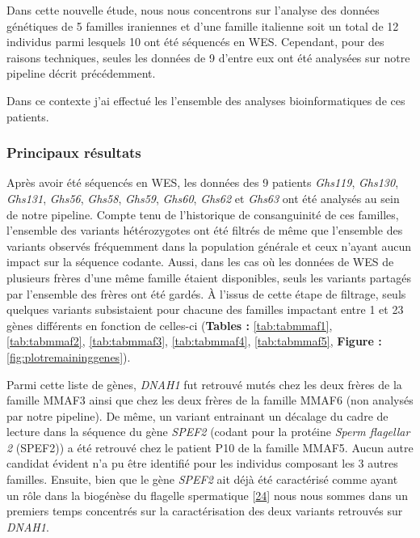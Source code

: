 \documentclass[12pt,twoside]{ugathesis}
\begin{document}
Dans cette nouvelle étude, nous nous concentrons sur l'analyse des
données génétiques de 5 familles iraniennes et d'une famille italienne
soit un total de 12 individus parmi lesquels 10 ont été séquencés en
WES. Cependant, pour des raisons techniques, seules les données de 9
d'entre eux ont été analysées sur notre pipeline décrit précédemment.

Dans ce contexte j'ai effectué les l'ensemble des analyses
bioinformatiques de ces patients.

\newpage



\newpage

\subsubsection{Principaux résultats}\label{principaux-resultats-2}

Après avoir été séquencés en WES, les données des 9 patients
\emph{Ghs119}, \emph{Ghs130}, \emph{Ghs131}, \emph{Ghs56}, \emph{Ghs58},
\emph{Ghs59}, \emph{Ghs60}, \emph{Ghs62} et \emph{Ghs63} ont été
analysés au sein de notre pipeline. Compte tenu de l'historique de
consanguinité de ces familles, l'ensemble des variants hétérozygotes ont
été filtrés de même que l'ensemble des variants observés fréquemment
dans la population générale et ceux n'ayant aucun impact sur la séquence
codante. Aussi, dans les cas où les données de WES de plusieurs frères
d'une même famille étaient disponibles, seuls les variants partagés par
l'ensemble des frères ont été gardés. À l'issus de cette étape de
filtrage, seuls quelques variants subsistaient pour chacune des familles
impactant entre 1 et 23 gènes différents en fonction de celles-ci
(\textbf{Tables :} \ref{tab:tabmmaf1}, \ref{tab:tabmmaf2},
\ref{tab:tabmmaf3}, \ref{tab:tabmmaf4}, \ref{tab:tabmmaf5},
\textbf{Figure : }\ref{fig:plotremaininggenes}).

Parmi cette liste de gènes, \emph{DNAH1} fut retrouvé mutés chez les
deux frères de la famille MMAF3 ainsi que chez les deux frères de la
famille MMAF6 (non analysés par notre pipeline). De même, un variant
entrainant un décalage du cadre de lecture dans la séquence du gène
\emph{SPEF2} (codant pour la protéine \emph{Sperm flagellar 2} (SPEF2))
a été retrouvé chez le patient P10 de la famille MMAF5. Aucun autre
candidat évident n'a pu être identifié pour les individus composant les
3 autres familles. Ensuite, bien que le gène \emph{SPEF2} ait déjà été
caractérisé comme ayant un rôle dans la biogénèse du flagelle
spermatique {[}\protect\hyperlink{ref-Lehti2017}{24}{]} nous nous sommes
dans un premiers temps concentrés sur la caractérisation des deux
variants retrouvés sur \emph{DNAH1}.
\end{document}
